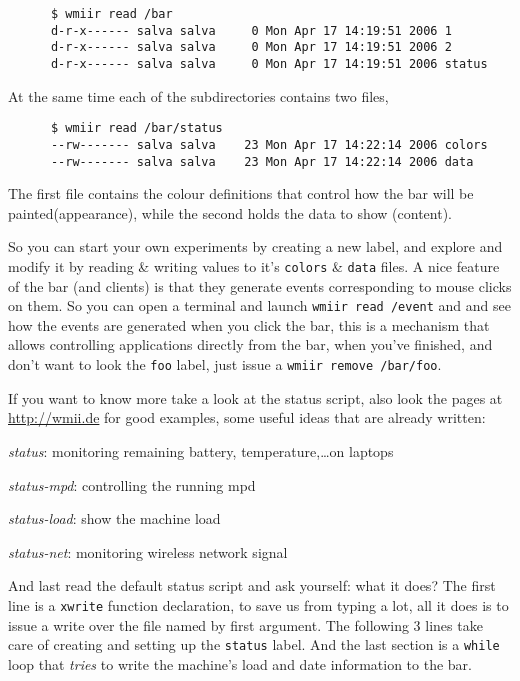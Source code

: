 \documentclass[12pt,a4paper]{article} %
\newcommand{\hrefx}[1]{\href{#1}{#1}} %
\newenvironment{itemize*}
  {\begin{itemize}
      \setlength{\itemsep}{0pt}
      \setlength{\parskip}{0pt}}
  {\end{itemize}}
\begin{document}
    \begin{verbatim}
      $ wmiir read /bar
      d-r-x------ salva salva     0 Mon Apr 17 14:19:51 2006 1
      d-r-x------ salva salva     0 Mon Apr 17 14:19:51 2006 2
      d-r-x------ salva salva     0 Mon Apr 17 14:19:51 2006 status
    \end{verbatim}
  
    At the same time each of the subdirectories contains two files,

    \begin{verbatim}
      $ wmiir read /bar/status
      --rw------- salva salva    23 Mon Apr 17 14:22:14 2006 colors
      --rw------- salva salva    23 Mon Apr 17 14:22:14 2006 data
    \end{verbatim}


    The first file contains the colour definitions that control how the
    bar will be painted(appearance), while the second holds the data
    to show (content).
    
    So you can start your own experiments by creating a new label, and
    explore and modify it by reading \& writing values to it's
    \verb+colors+ \& \verb+data+ files.  A nice feature of the bar
    (and clients) is that they generate events corresponding to mouse
    clicks on them.  So you can open a terminal and launch
    \verb+wmiir read /event+ and and see how the events are generated
    when you click the bar, this is a mechanism that allows
    controlling applications directly from the bar, when you've
    finished, and don't want to look the \verb+foo+ label, just issue
    a \verb+wmiir remove /bar/foo+.
  
    If you want to know more take a look at the status script, also
    look the pages at \hrefx{http://wmii.de} for good examples, some
    useful ideas that are already written:

    \begin{itemize*}
    \item \emph{status}: monitoring remaining battery, temperature,\dots on laptops
    \item \emph{status-mpd}: controlling the running mpd
    \item \emph{status-load}: show the machine load
    \item \emph{status-net}: monitoring wireless network signal
    \end{itemize*}
  
    And last read the default status script and ask yourself: what it
    does?   The first line is a
    \verb+xwrite+ function declaration, to save us from typing a lot,
    all it does is to issue a write over the file named by first
    argument. The following 3 lines take care of creating and setting
    up the \verb+status+ label. And the last section is a \verb+while+
    loop that \emph{tries} to write the machine's load and date
    information to the bar.\\
  
\end{document}
